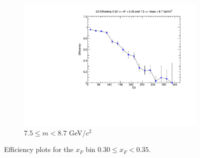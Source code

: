 \documentclass[11pt]{article}
\begin{document}
\begin{figure}[p]
\begin{subfigure}[b]{0.32\textwidth}
        \includegraphics[width=\textwidth]{./kTrackerEfficiencyPlots/D2_Efficiency_xF6_mass10.pdf}
        \caption{$7.5 \leq m < 8.7$ GeV/$c^2$}
    \end{subfigure}
    \caption{Efficiency plots for the $x_F$ bin $0.30 \leq x_F < 0.35$.}
\end{figure}
\end{document}
